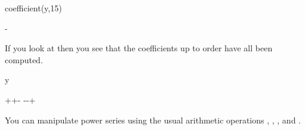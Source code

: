 {{{{{{{{{{{{{{\begin{xtc}
\begin{spadsrc}
coefficient(y,15) 
\end{spadsrc}
\begin{TeXOutput}
\begin{fricasmath}{4}
-{}%
\end{fricasmath}
\end{TeXOutput}
\end{xtc}
\begin{xtc}
\begin{xtccomment}
If you look at 
then you see that the coefficients up to order 
have all been computed.
\end{xtccomment}
\begin{spadsrc}
y 
\end{spadsrc}
\begin{TeXOutput}
\begin{fricasmath}{5}
++\TIMES {}-{%
\TIMES {}}-{\TIMES {}}-{\TIMES {}}+%
\end{fricasmath}
\end{TeXOutput}
\end{xtc}


You can manipulate power series using the usual arithmetic operations
,
,
, and
.
%

}}}}}}}}}}}}}}
